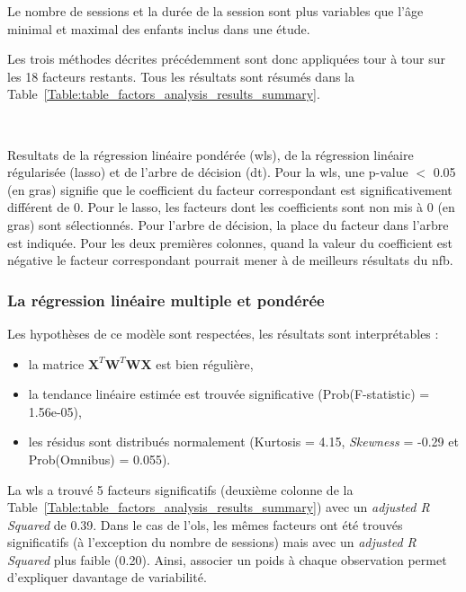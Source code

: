 Le nombre de sessions et la durée de la session sont plus variables que l'âge minimal et maximal des enfants inclus dans une étude. 

Les trois méthodes décrites précédemment sont donc appliquées tour à tour sur les 18 facteurs restants. Tous les résultats sont résumés dans la 
Table~\ref{Table:table_factors_analysis_results_summary}.

\newpage\
\begin{table}[h!]
  \centering
  \caption{Resultats de la régression linéaire pondérée (\gls{wls}), de la régression linéaire régularisée (\gls{lasso}) et de l'arbre de décision (\gls{dt}). Pour la \gls{wls}, une p-value $<$ 0.05 
	(en gras) signifie que le coefficient du facteur correspondant est significativement différent de 0. Pour le \gls{lasso}, les facteurs dont les coefficients sont non mis à 0 (en gras) sont 
	sélectionnés. Pour l'arbre de décision, la place du facteur dans l'arbre est indiquée. Pour les deux premières colonnes, quand la valeur du coefficient est négative le facteur 
	correspondant pourrait mener à de meilleurs résultats du \gls{nfb}.}
  
  \label{Table:table_factors_analysis_results_summary}
\end{table}

\subsubsection{La régression linéaire multiple et pondérée}

Les hypothèses de ce modèle sont respectées, les résultats sont interprétables :
\begin{itemize}
	\item la matrice ${\textbf{X}}^{T}\textbf{W}^{T}\textbf{WX}$ est bien régulière,
  \item la tendance linéaire estimée est trouvée significative (Prob(F-statistic) = 1.56e-05),
  \item les résidus sont distribués normalement (Kurtosis = 4.15, \textit{Skewness} = -0.29 et Prob(Omnibus) = 0.055).
\end{itemize}

La \gls{wls} a trouvé 5 facteurs significatifs (deuxième colonne de la Table~\ref{Table:table_factors_analysis_results_summary}) avec un \textit{adjusted R Squared} de 0.39. 
Dans le cas de l'\gls{ols}, les mêmes facteurs ont été trouvés significatifs (à l'exception du nombre de sessions) mais avec un \textit{adjusted R Squared} plus faible (0.20). Ainsi, associer un poids
à chaque observation permet d'expliquer davantage de variabilité. 

